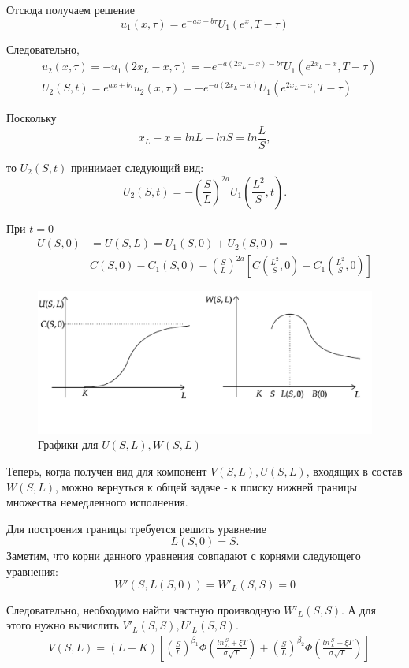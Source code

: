 \documentclass[oneside,final,12pt]{article}
\begin{document}
Отсюда получаем решение
$$
u_1(x,\tau)=e^{-ax-b\tau} U_1(e^x,T-\tau)
$$

Следовательно, 
\begin{align*}
& u_2(x,\tau)=-u_1(2x_L-x,\tau)=-e^{-a(2x_L-x)-b\tau}U_1(e^{2x_L-x},T-\tau) \\
& U_2(S,t)=e^{ax+b\tau}u_2(x,\tau)=-e^{-a(2x_L-x)}U_1(e^{2x_L-x},T-\tau)
\end{align*}

Поскольку
$$ x_L-x=ln L -ln S = ln \frac{L}{S},$$

\noindent
то $U_2(S,t)$ принимает следующий вид:
$$
U_2(S,t)=-\left( \frac{S}{L} \right)^{2a} U_1\left(\frac{L^2}{S},t\right).
$$

При $t=0$
\begin{align*}
   U(S,0)& =U(S,L)=U_1(S,0)+U_2(S,0)= \\
   & C(S,0)-C_1(S,0)-\left( \frac{S}{L}\right)^{2a}\left[ C\left(\frac{L^2}{S},0\right)-C_1\left(\frac{L^2}{S},0\right)\right]
\end{align*}

\begin{figure}[h]
    \centering
    \includegraphics[scale=0.9]{Graph5.pdf}
    \caption{Графики для $U(S,L), W(S,L)$}
    \label{graphics}
\end{figure}

Теперь, когда получен вид для компонент $V(S,L),U(S,L)$, входящих в состав $W(S,L)$, можно вернуться к общей задаче - к поиску нижней границы множества немедленного исполнения.

Для построения границы требуется решить уравнение
$$ L(S,0) = S. $$
Заметим, что корни данного уравнения совпадают с корнями следующего уравнения:
$$ W'(S,L(S,0)) = W'_L(S,S)=0 $$

Следовательно, необходимо найти частную производную $W'_L(S,S)$. А для этого нужно вычислить $V'_L(S,S), U'_L(S,S)$.
\begin{align*}
    & V(S,L) = (L-K) \left[ \left(\frac{S}{L} \right)^{\beta_1} \Phi\left( \frac{ln \frac{S}{L}+\xi T}{\sigma \sqrt{T}} \right) + \left(\frac{S}{L} \right)^{\beta_2} \Phi\left( \frac{ln \frac{S}{L}-\xi T}{\sigma \sqrt{T}} \right) \right]
\end{align*}
\end{document}
